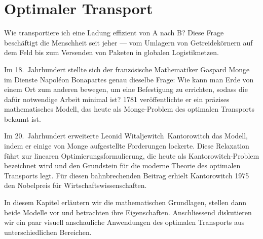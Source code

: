 %
%
%
%
\newcommand{\wasserstein}[1][p]{\mathcal{W}_{#1}}
\chapter{Optimaler Transport\label{chapter:mongekant}}
\begin{refsection}

\noindent
Wie transportiere ich eine Ladung effizient von A nach B?
Diese Frage beschäftigt die Menschheit seit jeher ---
vom Umlagern von Getreidekörnern auf dem Feld
%
bis zum Versenden von Paketen in globalen Logistiknetzen.
%
%

Im 18.~Jahrhundert stellte sich der französische Mathematiker Gaspard Monge
%
im Dienste Napoléon Bonapartes genau dieselbe Frage:
Wie kann man Erde von einem Ort zum anderen bewegen,
um eine Befestigung zu errichten,
%
sodass die dafür notwendige Arbeit minimal ist?
1781 veröffentlichte er ein präzises mathematisches Modell,
das heute als Monge-Problem des optimalen Transports bekannt ist.
%
%

Im 20.~Jahrhundert erweiterte Leonid Witaljewitch~Kantorowitch das Modell,
%
indem er einige von Monge aufgestellte Forderungen lockerte.
Diese Relaxation führt zur linearen Optimierungsformulierung,
%
die heute als Kantorowitch-Problem bezeichnet wird
%
und den Grundstein für die moderne Theorie des optimalen Transports legt.
Für diesen bahnbrechenden Beitrag erhielt Kantorowitch 1975
den Nobelpreis für Wirtschaftswissenschaften.
%

In diesem Kapitel erläutern wir die mathematischen Grundlagen,
stellen dann beide Modelle vor und betrachten ihre Eigenschaften.
Anschliessend diskutieren wir ein paar visuell anschauliche Anwendungen
des optimalen Transports aus unterschiedlichen Bereichen.






\printbibliography[heading=subbibliography]
\end{refsection}
